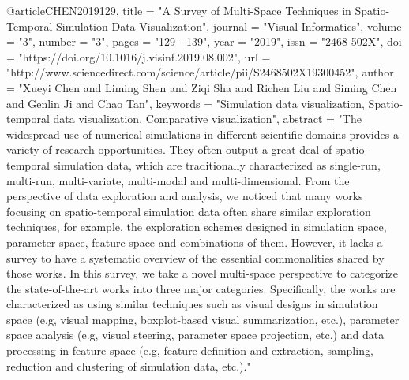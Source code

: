 @article{CHEN2019129,
title = "A Survey of Multi-Space Techniques in Spatio-Temporal Simulation Data Visualization",
journal = "Visual Informatics",
volume = "3",
number = "3",
pages = "129 - 139",
year = "2019",
issn = "2468-502X",
doi = "https://doi.org/10.1016/j.visinf.2019.08.002",
url = "http://www.sciencedirect.com/science/article/pii/S2468502X19300452",
author = "Xueyi Chen and Liming Shen and Ziqi Sha and Richen Liu and Siming Chen and Genlin Ji and Chao Tan",
keywords = "Simulation data visualization, Spatio-temporal data visualization, Comparative visualization",
abstract = "The widespread use of numerical simulations in different scientific domains provides a variety of research opportunities. They often output a great deal of spatio-temporal simulation data, which are traditionally characterized as single-run, multi-run, multi-variate, multi-modal and multi-dimensional. From the perspective of data exploration and analysis, we noticed that many works focusing on spatio-temporal simulation data often share similar exploration techniques, for example, the exploration schemes designed in simulation space, parameter space, feature space and combinations of them. However, it lacks a survey to have a systematic overview of the essential commonalities shared by those works. In this survey, we take a novel multi-space perspective to categorize the state-of-the-art works into three major categories. Specifically, the works are characterized as using similar techniques such as visual designs in simulation space (e.g, visual mapping, boxplot-based visual summarization, etc.), parameter space analysis (e.g, visual steering, parameter space projection, etc.) and data processing in feature space (e.g, feature definition and extraction, sampling, reduction and clustering of simulation data, etc.)."
}